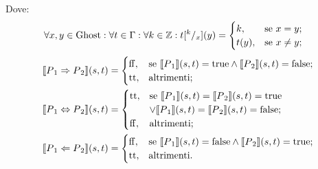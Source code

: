 Dove:
\begin{align*}
   \forall x,y\in\mathrm{Ghost}\mathrel{:}\forall t \in\Gamma\mathrel{:}\forall k\in\mathbb{Z} \mathrel{:} t[^k/_x]( y) 
      &=
        \begin{cases}
                 k,   &\text{se $x = y$};\\
                 t(y),&\text{se $x  \neq  y$};
        \end{cases}
\end{align*}
\begin{align*}
    \llbracket P{_1} \Rightarrow P{_2}\rrbracket(s,t) 
       &=
        \begin{cases}
            \mathrm{ff}, &\text{se $\llbracket P{_1}\rrbracket(s,t) = \mathrm{true} \wedge \llbracket P{_2}\rrbracket(s,t) = \mathrm{false}$};\\
            \mathrm{tt}, &\text{altrimenti};
        \end{cases}\\
    \llbracket P{_1} \Leftrightarrow P{_2}\rrbracket(s,t) 
       &=
        \begin{cases}
            \mathrm{tt},&\text{se $\llbracket P{_1}\rrbracket(s,t) = \llbracket P{_2}\rrbracket(s,t) = \mathrm{true}$}\\
                 &\text{$\vee\llbracket P{_1}\rrbracket(s,t) = \llbracket P{_2} \rrbracket(s,t) = \mathrm{false}$};  \\
           \mathrm{ff}, &\text{altrimenti};
        \end{cases} \\
   \llbracket P{_1} \Leftarrow P{_2}\rrbracket(s,t) 
      &=
        \begin{cases}
            \mathrm{ff},&\text{se $\llbracket P{_1}\rrbracket(s,t) = \mathrm{false} \wedge \llbracket P{_2}\rrbracket(s,t) = \mathrm{true}$};\\
            \mathrm{tt},&\text{altrimenti}.
   \end{cases}
\end{align*}

